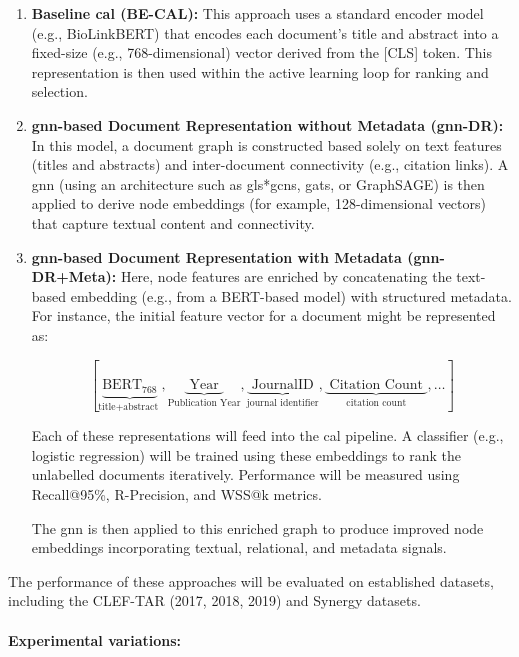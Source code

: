 \documentclass[10pt,oneside]{book}
\begin{document}
\begin{enumerate} \item \textbf{Baseline \gls*{cal} (BE-CAL):}
This approach uses a standard encoder model (e.g., BioLinkBERT) that encodes each document’s title and abstract into a fixed-size (e.g., 768-dimensional) vector derived from the [CLS] token. This representation is then used within the active learning loop for ranking and selection.

\item \textbf{\gls*{gnn}-based Document Representation without Metadata (\gls*{gnn}-DR):}
In this model, a document graph is constructed based solely on text features (titles and abstracts) and inter-document connectivity (e.g., citation links). A \gls*{gnn} (using an architecture such as gls*{gcn}s, \gls*{gats}, or GraphSAGE) is then applied to derive node embeddings (for example, 128-dimensional vectors) that capture textual content and connectivity.

\item \textbf{\gls*{gnn}-based Document Representation with Metadata (\gls*{gnn}-DR+Meta):}
Here, node features are enriched by concatenating the text-based embedding (e.g., from a BERT-based model) with structured metadata. For instance, the initial feature vector for a document might be represented as:


\[
[\underbrace{\mathrm{BERT}_{768}}_{\text {title+abstract }}, \underbrace{\text { Year }}_{\text{Publication Year}}, \underbrace{\text { JournalID }}_{\text{journal identifier}} , \underbrace{\text { Citation Count }}_{\text{citation count}} ,\ldots] 
\]

\vspace{0.5em}

Each of these representations will feed into the \gls*{cal} pipeline. A classifier (e.g., logistic regression) will be trained using these embeddings to rank the unlabelled documents iteratively. Performance will be measured using Recall@95\%, R-Precision, and WSS@k metrics.

The \gls*{gnn} is then applied to this enriched graph to produce improved node embeddings incorporating textual, relational, and metadata signals. \end{enumerate}
The performance of these approaches will be evaluated on established datasets, including the CLEF-TAR (2017, 2018, 2019) and Synergy datasets.
\paragraph{Experimental variations:}
\end{document}
